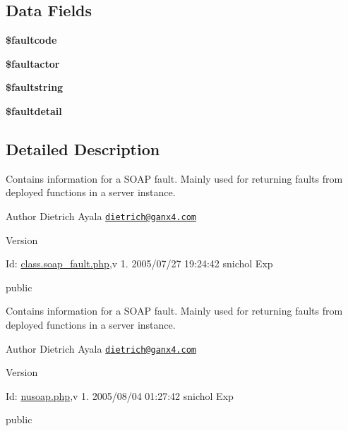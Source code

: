 \subsection*{Data Fields}
\begin{DoxyCompactItemize}
\item 
\hypertarget{classsoap__fault_a07e7ee58f39f98cdd8b2bd2b40ff72d7}{{\bfseries \$faultcode}}\label{classsoap__fault_a07e7ee58f39f98cdd8b2bd2b40ff72d7}

\item 
\hypertarget{classsoap__fault_a671472ecd6911705ac4c919bba6d1eec}{{\bfseries \$faultactor}}\label{classsoap__fault_a671472ecd6911705ac4c919bba6d1eec}

\item 
\hypertarget{classsoap__fault_acc1a7d86f9bd39e5717add56fbcdfaaa}{{\bfseries \$faultstring}}\label{classsoap__fault_acc1a7d86f9bd39e5717add56fbcdfaaa}

\item 
\hypertarget{classsoap__fault_a7683364ae0ad0e22863a0f20f0626453}{{\bfseries \$faultdetail}}\label{classsoap__fault_a7683364ae0ad0e22863a0f20f0626453}

\end{DoxyCompactItemize}


\subsection{Detailed Description}
Contains information for a S\-O\-A\-P fault. Mainly used for returning faults from deployed functions in a server instance. \begin{DoxyAuthor}{Author}
Dietrich Ayala \href{mailto:dietrich@ganx4.com}{\tt dietrich@ganx4.\-com} 
\end{DoxyAuthor}
\begin{DoxyVersion}{Version}

\end{DoxyVersion}
\begin{DoxyParagraph}{Id\-:}
\hyperlink{class_8soap__fault_8php_source}{class.\-soap\-\_\-fault.\-php},v 1. 2005/07/27 19\-:24\-:42 snichol Exp 
\end{DoxyParagraph}
public

Contains information for a S\-O\-A\-P fault. Mainly used for returning faults from deployed functions in a server instance. \begin{DoxyAuthor}{Author}
Dietrich Ayala \href{mailto:dietrich@ganx4.com}{\tt dietrich@ganx4.\-com} 
\end{DoxyAuthor}
\begin{DoxyVersion}{Version}

\end{DoxyVersion}
\begin{DoxyParagraph}{Id\-:}
\hyperlink{nusoap_8php_source}{nusoap.\-php},v 1. 2005/08/04 01\-:27\-:42 snichol Exp 
\end{DoxyParagraph}
public 

